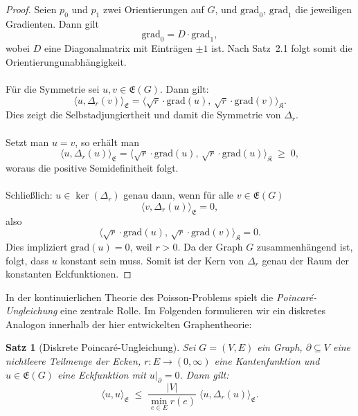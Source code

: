 \documentclass[11pt,a4paper,leqno]{report}
\newtheorem{proposition}{Satz}[chapter]
\numberwithin{equation}{chapter}
\begin{document}
\begin{proof}
	Seien $p_0$ und $p_1$ zwei Orientierungen auf $G$, 
	und $\mathrm{grad}_0$, $\mathrm{grad}_1$ die jeweiligen Gradienten. 
	Dann gilt
	\[
	\mathrm{grad}_0 = D \cdot \mathrm{grad}_1,
	\]
	wobei $D$ eine Diagonalmatrix mit Einträgen $\pm 1$ ist. 
	Nach Satz~2.1 folgt somit die Orientierungunabhängigkeit.\\
	\\
	Für die Symmetrie sei $u,v \in \mathfrak{E}(G)$. Dann gilt:
	\[
	\langle u, \Delta_r(v)\rangle_{\mathfrak{E}}
	= \langle \sqrt{r}\cdot \mathrm{grad}(u),\, \sqrt{r}\cdot \mathrm{grad}(v)\rangle_{\mathfrak{K}}.
	\]
	Dies zeigt die Selbstadjungiertheit und damit die Symmetrie von $\Delta_r$. \\
	\\
	Setzt man $u=v$, so erhält man
	\[
	\langle u, \Delta_r(u)\rangle_{\mathfrak{E}}
	= \langle \sqrt{r}\cdot \mathrm{grad}(u),\, \sqrt{r}\cdot \mathrm{grad}(u)\rangle_{\mathfrak{K}}
	\;\geq\;0,
	\]
	woraus die positive Semidefinitheit folgt.\\
	\\
	Schließlich: $u \in \ker(\Delta_r)$ genau dann, wenn für alle $v \in \mathfrak{E}(G)$
	\[
	\langle v, \Delta_r(u)\rangle_{\mathfrak{E}} = 0,
	\]
	also
	\[
	\langle \sqrt{r}\cdot \mathrm{grad}(u), \, \sqrt{r}\cdot \mathrm{grad}(v)\rangle_{\mathfrak{K}} = 0.
	\]
	Dies impliziert $\mathrm{grad}(u)=0$, weil $r>0$. Da der Graph $G$ zusammenhängend ist, folgt, 
	dass $u$ konstant sein muss. Somit ist der Kern von $\Delta_r$ genau der Raum der konstanten Eckfunktionen.
\end{proof}
\noindent
In der kontinuierlichen Theorie des Poisson-Problems spielt die 
\emph{Poincaré-Ungleichung} eine zentrale Rolle. 
Im Folgenden formulieren wir ein diskretes Analogon 
innerhalb der hier entwickelten Graphentheorie:
\begin{proposition}[Diskrete Poincaré-Ungleichung]\label{prop:poincare}
	Sei $G=(V,E)$ ein Graph, $\partial \subseteq V$ eine nichtleere Teilmenge 
	der Ecken, $r:E\to (0,\infty)$ eine Kantenfunktion und $u \in \mathfrak{E}(G)$ 
	eine Eckfunktion mit $u|_\partial = 0$. Dann gilt:
	\[
	\langle u, u \rangle_{\mathfrak{E}} 
	\;\leq\; \frac{|V|}{\min_{e\in E} r(e)} \;
	\langle u, \Delta_r(u) \rangle_{\mathfrak{E}} .
	\]
\end{proposition}
\end{document}
